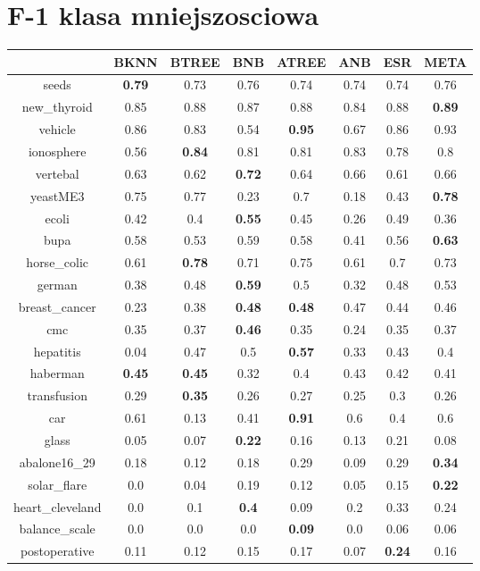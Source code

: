\documentclass{article}%
\begin{document}
%
\section*{F{-}1 klasa mniejszosciowa}%
\begin{tabular}{c|ccccccc}%
\hline%
&BKNN&BTREE&BNB&ATREE&ANB&ESR&META\\%
\hline%
seeds&\textbf{0.79}&0.73&0.76&0.74&0.74&0.74&0.76\\%
new\_thyroid&0.85&0.88&0.87&0.88&0.84&0.88&\textbf{0.89}\\%
vehicle&0.86&0.83&0.54&\textbf{0.95}&0.67&0.86&0.93\\%
ionosphere&0.56&\textbf{0.84}&0.81&0.81&0.83&0.78&0.8\\%
vertebal&0.63&0.62&\textbf{0.72}&0.64&0.66&0.61&0.66\\%
yeastME3&0.75&0.77&0.23&0.7&0.18&0.43&\textbf{0.78}\\%
ecoli&0.42&0.4&\textbf{0.55}&0.45&0.26&0.49&0.36\\%
bupa&0.58&0.53&0.59&0.58&0.41&0.56&\textbf{0.63}\\%
horse\_colic&0.61&\textbf{0.78}&0.71&0.75&0.61&0.7&0.73\\%
german&0.38&0.48&\textbf{0.59}&0.5&0.32&0.48&0.53\\%
breast\_cancer&0.23&0.38&\textbf{0.48}&\textbf{0.48}&0.47&0.44&0.46\\%
cmc&0.35&0.37&\textbf{0.46}&0.35&0.24&0.35&0.37\\%
hepatitis&0.04&0.47&0.5&\textbf{0.57}&0.33&0.43&0.4\\%
haberman&\textbf{0.45}&\textbf{0.45}&0.32&0.4&0.43&0.42&0.41\\%
transfusion&0.29&\textbf{0.35}&0.26&0.27&0.25&0.3&0.26\\%
car&0.61&0.13&0.41&\textbf{0.91}&0.6&0.4&0.6\\%
glass&0.05&0.07&\textbf{0.22}&0.16&0.13&0.21&0.08\\%
abalone16\_29&0.18&0.12&0.18&0.29&0.09&0.29&\textbf{0.34}\\%
solar\_flare&0.0&0.04&0.19&0.12&0.05&0.15&\textbf{0.22}\\%
heart\_cleveland&0.0&0.1&\textbf{0.4}&0.09&0.2&0.33&0.24\\%
balance\_scale&0.0&0.0&0.0&\textbf{0.09}&0.0&0.06&0.06\\%
postoperative&0.11&0.12&0.15&0.17&0.07&\textbf{0.24}&0.16\\%
\end{tabular}

%
\end{document}
